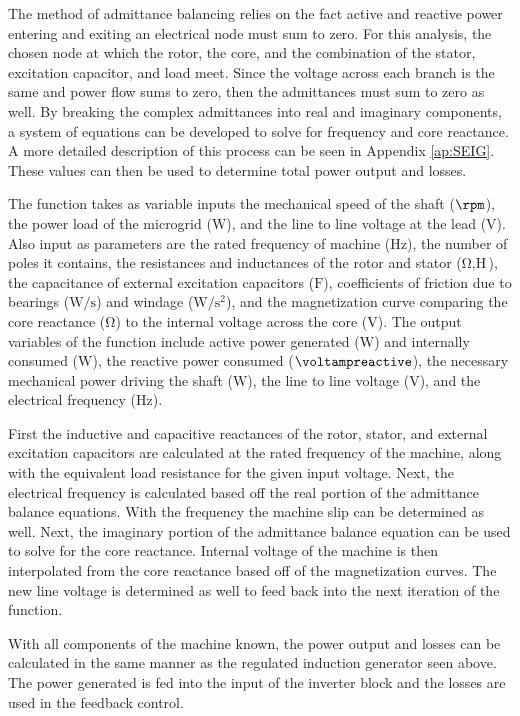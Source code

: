 The method of admittance balancing relies on the fact active and reactive power entering and exiting an electrical node must sum to zero. For this analysis, the chosen node at which the rotor, the core, and the combination of the stator, excitation capacitor, and load meet. Since the voltage across each branch is the same and power flow sums to zero, then the admittances must sum to zero as well. By breaking the complex admittances into real and imaginary components, a system of equations can be developed to solve for frequency and core reactance. A more detailed description of this process can be seen in Appendix \autoref{ap:SEIG}. These values can then be used to determine total power output and losses. 

The function takes as variable inputs the mechanical speed of the shaft ($\si{\rpm}$), the power load of the microgrid ($\si{\watt}$), and the line to line voltage at the lead ($\si{\volt}$). Also input as parameters are the rated frequency of machine ($\si{\hertz}$), the number of poles it contains, the resistances and inductances of the rotor and stator ($\si{\ohm}, \si{\henry}$), the capacitance of external excitation capacitors ($\si{\farad}$), coefficients of friction due to bearings ($\si{\watt\per\second}$) and windage ($\si{\watt\per\second\squared}$), and the magnetization curve comparing the core reactance ($\si{\ohm}$) to the internal voltage across the core ($\si{\volt}$). The output variables of the function include active power generated ($\si{\watt}$) and internally consumed ($\si{\watt}$), the reactive power consumed ($\si{\voltampreactive}$), the necessary mechanical power driving the shaft ($\si{\watt}$), the line to line voltage ($\si{\volt}$), and the electrical frequency ($\si{\hertz}$).

First the inductive and capacitive reactances of the rotor, stator, and external excitation capacitors are calculated at the rated frequency of the machine, along with the equivalent load resistance for the given input voltage. Next, the electrical frequency is calculated based off the real portion of the admittance balance equations. With the frequency the machine slip can be determined as well. Next, the imaginary portion of the admittance balance equation can be used to solve for the core reactance. Internal voltage of the machine is then interpolated from the core reactance based off of the magnetization curves. The new line voltage is determined as well to feed back into the next iteration of the function.

With all components of the machine known, the power output and losses can be calculated in the same manner as the regulated induction generator seen above. The power generated is fed into the input of the inverter block and the losses are used in the feedback control.

